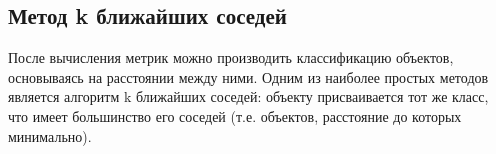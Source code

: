 \subsection{Метод k ближайших соседей}

После вычисления метрик можно производить классификацию объектов, основываясь на расстоянии между ними. Одним из наиболее простых методов является алгоритм k ближайших соседей: объекту присваивается тот же класс, что имеет большинство его соседей (т.е. объектов, расстояние до которых минимально).

